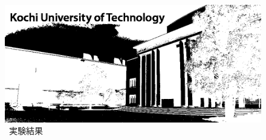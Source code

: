 \begin{figure}[H]
\begin{minipage}[b]{.23\textwidth}
    \end{minipage}
    \begin{minipage}[b]{.23\textwidth}
        \centering
        \includegraphics[keepaspectratio,width=\textwidth]{../../Figures/05_34_1.png}
    \end{minipage}
    \caption{\kadaiac\ 実験結果}
\end{figure}
